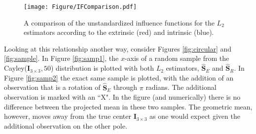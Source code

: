 \documentclass{article}\usepackage[]{graphicx}\usepackage[]{color}
\newcommand{\ProjMean}{{\widehat{\bm S}_{E}}}
\newcommand{\GeomMean}{{\widehat{\bm S}_{R}}}
\begin{document}
\begin{figure}
\begin{center}
\texttt{[image: Figure/IFComparison.pdf]}
\end{center}\vspace{-1em}
\caption{A comparison of the unstandardized influence functions for the $L_2$ estimators according to the extrinsic (red) and intrinsic (blue).}
\label{fig:IFs}
\end{figure} 
 
 
Looking at this relationship another way, consider Figures \ref{fig:circular} and \ref{fig:sample}.  In Figure \ref{fig:samp1}, the $x$-axis of a random sample from the Cayley($\bm I_{3\times 3},50$) distribution is plotted with both $L_2$ estimators, $\ProjMean$ and $\GeomMean$.  In Figure \ref{fig:samp2} the exact same sample is plotted, with the addition of an observation that is a rotation of $\ProjMean$ through $\pi$ radians.  The additional observation is marked with an ``X".  In the figure (and numerically) there is no difference between the projected mean in these two samples.  The geometric mean, however, moves away from the true center $\bm I_{3\times 3}$ as one would expect given the additional observation on the other pole.
\end{document}
